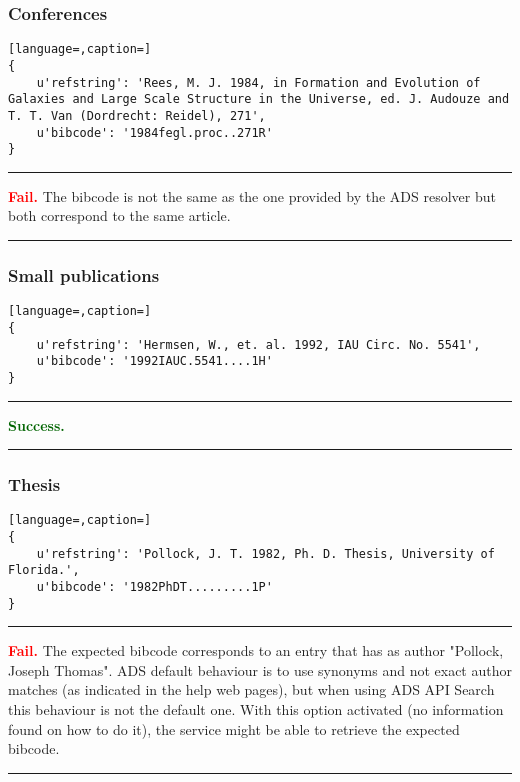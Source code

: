 \documentclass[a4paper,10pt,twoside]{article}
\begin{document}
\subsubsection{Conferences}

\begin{lstlisting}[language=,caption=]
{
	u'refstring': 'Rees, M. J. 1984, in Formation and Evolution of Galaxies and Large Scale Structure in the Universe, ed. J. Audouze and T. T. Van (Dordrecht: Reidel), 271',
	u'bibcode': '1984fegl.proc..271R'
}
\end{lstlisting}

\noindent
{\color{red} \rule{\linewidth}{0.5mm} }
\textbf{\textcolor{red}{Fail.}} The bibcode is not the same as the one provided by the ADS resolver but both correspond to the same article.\\
\noindent
{\color{red} \rule{\linewidth}{0.5mm} }

\subsubsection{Small publications}

\begin{lstlisting}[language=,caption=]
{
	u'refstring': 'Hermsen, W., et. al. 1992, IAU Circ. No. 5541',
	u'bibcode': '1992IAUC.5541....1H'
}
\end{lstlisting}

\noindent
{\color{darkgreen} \rule{\linewidth}{0.5mm} }
\textbf{\textcolor{darkgreen}{Success.}} \\
\noindent
{\color{darkgreen} \rule{\linewidth}{0.5mm} }

\subsubsection{Thesis}

\begin{lstlisting}[language=,caption=]
{
	u'refstring': 'Pollock, J. T. 1982, Ph. D. Thesis, University of Florida.',
	u'bibcode': '1982PhDT.........1P'
}
\end{lstlisting}

\noindent
{\color{red} \rule{\linewidth}{0.5mm} }
\textbf{\textcolor{red}{Fail.}} The expected bibcode corresponds to an entry that has as author "Pollock, Joseph Thomas".  ADS default behaviour is to use synonyms and not exact author matches (as indicated in the help web pages), but when using ADS API Search this behaviour is not the default one. With this option activated (no information found on how to do it), the service might be able to retrieve the expected bibcode. \\
\noindent
{\color{red} \rule{\linewidth}{0.5mm} }
\end{document}
